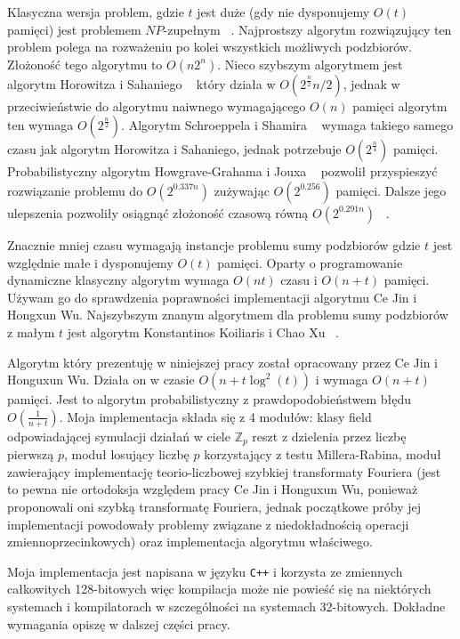 \documentclass{article}
\begin{document}
Klasyczna wersja problem, gdzie $t$ jest duże (gdy nie dysponujemy $O(t)$ pamięci) jest problemem 
$NP$-zupełnym ~\cite{sasamoto2001statistical}. Najprostszy algorytm rozwiązujący ten problem polega na rozważeniu po kolei wszystkich 
możliwych podzbiorów. Złożoność tego algorytmu to $O(n2^n)$. Nieco szybszym algorytmem jest algorytm Horowitza
i Sahaniego ~\cite{horowitz1974computing} który działa w $O(2^{\frac{n}{2}}n/2)$, jednak w przeciwieństwie do algorytmu naiwnego wymagającego
$O(n)$ pamięci algorytm ten wymaga $O(2^{\frac{n}{2}})$. Algorytm Schroeppela i Shamira ~\cite{schroeppel1981t} wymaga takiego samego
czasu jak algorytm Horowitza i Sahaniego, jednak potrzebuje $O(2^{\frac{n}{4}})$ pamięci. Probabilistyczny 
algorytm Howgrave-Grahama i Jouxa ~\cite{howgrave2010new} pozwolił przyspieszyć rozwiązanie problemu do $O(2^{0.337n})$
zużywając $O(2^{0.256})$ pamięci. Dalsze jego ulepszenia pozwoliły osiągnąć złożoność czasową równą 
$O(2^{0.291n})$ ~\cite{becker2011improved}.

Znacznie mniej czasu wymagają instancje problemu sumy podzbiorów gdzie $t$ jest względnie małe i dysponujemy
$O(t)$ pamięci. Oparty o programowanie dynamiczne klasyczny algorytm wymaga $O(nt)$ czasu i $O(n+t)$ pamięci.
Używam go do sprawdzenia poprawności implementacji algorytmu Ce Jin i Hongxun Wu. Najszybszym znanym algorytmem 
dla problemu sumy podzbiorów z małym $t$ jest algorytm Konstantinos Koiliaris i Chao Xu ~\cite{bach1997comments}. 

Algorytm który prezentuję w niniejszej pracy został opracowany przez Ce Jin i Honguxun Wu. Działa on w czasie 
$O(n+t\log^2(t))$ i wymaga $O(n+t)$ pamięci. Jest to algorytm probabilistyczny z prawdopodobieństwem błędu $O(\frac{1}{n+t})$.
Moja implementacja składa się z 4 modułów: klasy field odpowiadającej symulacji 
działań w ciele $\mathbb{Z}_p$ reszt z dzielenia przez liczbę pierwszą $p$, moduł losujący liczbę $p$ korzystający z testu 
Millera-Rabina,
moduł zawierający implementację teorio-liczbowej szybkiej transformaty Fouriera (jest to pewna nie ortodoksja względem pracy
Ce Jin i Honguxun Wu, ponieważ proponowali oni szybką transformatę Fouriera, jednak początkowe próby jej implementacji
powodowały problemy związane z niedokładnością operacji zmiennoprzecinkowych) oraz implementacja algorytmu właściwego.

Moja implementacja jest napisana w języku \texttt{C++} i korzysta ze zmiennych całkowitych 128-bitowych więc kompilacja może nie 
powieść się na niektórych systemach i kompilatorach w szczególności na systemach 32-bitowych. Dokładne wymagania opiszę
w dalszej części pracy.
\end{document}
